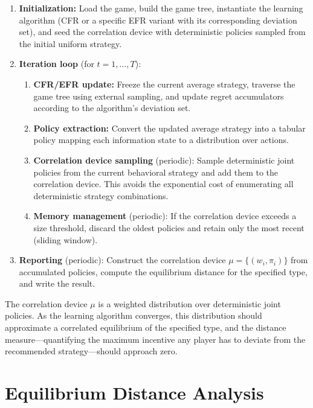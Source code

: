 \documentclass[11pt]{article}
\begin{document}
\begin{enumerate}
    \item \textbf{Initialization:} Load the game, build the game tree, instantiate the learning algorithm (CFR or a specific EFR variant with its corresponding deviation set), and seed the correlation device with deterministic policies sampled from the initial uniform strategy.

    \item \textbf{Iteration loop} (for $t = 1, \ldots, T$):
    \begin{enumerate}
        \item \textbf{CFR/EFR update:} Freeze the current average strategy, traverse the game tree using external sampling, and update regret accumulators according to the algorithm's deviation set.
        \item \textbf{Policy extraction:} Convert the updated average strategy into a tabular policy mapping each information state to a distribution over actions.
        \item \textbf{Correlation device sampling} (periodic): Sample deterministic joint policies from the current behavioral strategy and add them to the correlation device. This avoids the exponential cost of enumerating all deterministic strategy combinations.
        \item \textbf{Memory management} (periodic): If the correlation device exceeds a size threshold, discard the oldest policies and retain only the most recent (sliding window).
    \end{enumerate}

    \item \textbf{Reporting} (periodic): Construct the correlation device $\mu = \{(w_i, \pi_i)\}$ from accumulated policies, compute the equilibrium distance for the specified type, and write the result.
\end{enumerate}

The correlation device $\mu$ is a weighted distribution over deterministic joint policies. As the learning algorithm converges, this distribution should approximate a correlated equilibrium of the specified type, and the distance measure---quantifying the maximum incentive any player has to deviate from the recommended strategy---should approach zero.

\newpage

\section{Equilibrium Distance Analysis}
\end{document}
